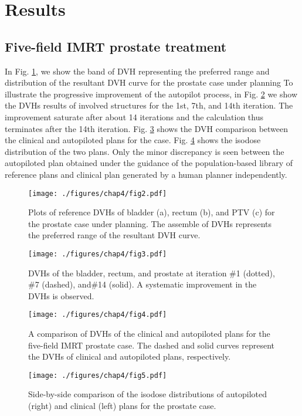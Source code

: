 \section{Results}

\subsection{Five-field IMRT prostate treatment}
In Fig. \ref{fig4.2}, we show the band of DVH representing the preferred range and distribution of the resultant DVH curve for the prostate case under planning To illustrate the progressive improvement of the autopilot process, in Fig. \ref{fig4.3} we show the DVHs results of involved structures for the 1st, 7th, and 14th iteration. The improvement saturate after about 14 iterations and the calculation thus terminates after the 14th iteration. Fig. \ref{fig4.4} shows the DVH comparison between the clinical and autopiloted plans for the case. Fig. \ref{fig4.5} shows the isodose distribution of the two plans. Only the minor discrepancy is seen between the autopiloted plan obtained under the guidance of the population-based library of reference plans and clinical plan generated by a human planner independently. 

\begin{figure}
	\centering
	\texttt{[image: ./figures/chap4/fig2.pdf]}
	\caption{Plots of reference DVHs of  bladder (a), rectum (b), and PTV (c) for the prostate case under planning. The assemble of DVHs represents the preferred range of the resultant DVH curve. 
	\label{fig4.2}}
    \end{figure}

\begin{figure}
	\centering
	\texttt{[image: ./figures/chap4/fig3.pdf]}
	\caption{DVHs of the bladder, rectum, and prostate at iteration \#1 (dotted), \#7 (dashed), and\#14 (solid).  A systematic improvement in the DVHs is observed. 
	\label{fig4.3}}
    \end{figure}

\begin{figure}
	\centering
	\texttt{[image: ./figures/chap4/fig4.pdf]}
	\caption{A comparison of DVHs of the clinical and autopiloted plans for the five-field IMRT prostate case. The dashed and solid curves represent the DVHs of clinical and autopiloted plans, respectively. 
	\label{fig4.4}}
    \end{figure}

\begin{figure}
	\centering
	\texttt{[image: ./figures/chap4/fig5.pdf]}
	\caption{Side-by-side comparison of the isodose distributions of autopiloted (right) and clinical (left) plans for the prostate case. 
	\label{fig4.5}}
    \end{figure}


